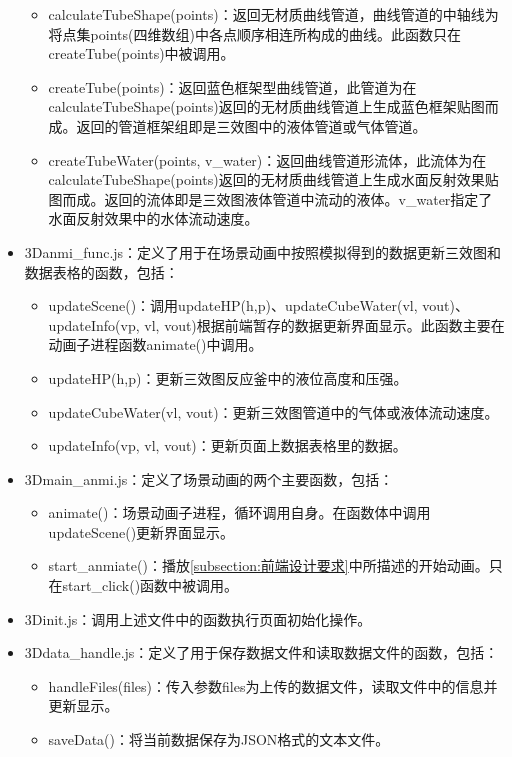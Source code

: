 \documentclass[a4paper]{ctexart}
\begin{document}
\begin{spacing}{1.25}
\begin{itemize}
\begin{itemize}
		\item calculateTubeShape(points)：返回无材质曲线管道，曲线管道的中轴线为将点集points(四维数组)中各点顺序相连所构成的曲线。此函数只在createTube(points)中被调用。
		\item createTube(points)：返回蓝色框架型曲线管道，此管道为在calculateTubeShape(points)返回的无材质曲线管道上生成蓝色框架贴图而成。返回的管道框架组即是三效图中的液体管道或气体管道。
		\item createTubeWater(points, v\_water)：返回曲线管道形流体，此流体为在calculateTubeShape(points)返回的无材质曲线管道上生成水面反射效果贴图而成。返回的流体即是三效图液体管道中流动的液体。v\_water指定了水面反射效果中的水体流动速度。
	\end{itemize}
	\item 3Danmi\_func.js：定义了用于在场景动画中按照模拟得到的数据更新三效图和数据表格的函数，包括：
	\begin{itemize}
		\item updateScene()：调用updateHP(h,p)、updateCubeWater(vl, vout)、updateInfo(vp, vl, vout)根据前端暂存的数据更新界面显示。此函数主要在动画子进程函数animate()中调用。
		\item updateHP(h,p)：更新三效图反应釜中的液位高度和压强。
		\item updateCubeWater(vl, vout)：更新三效图管道中的气体或液体流动速度。
		\item updateInfo(vp, vl, vout)：更新页面上数据表格里的数据。
	\end{itemize}
	\item 3Dmain\_anmi.js：定义了场景动画的两个主要函数，包括：
	\begin{itemize}
		\item animate()：场景动画子进程，循环调用自身。在函数体中调用updateScene()更新界面显示。
		\item start\_anmiate()：播放\ref{subsection:前端设计要求}中所描述的开始动画。只在start\_click()函数中被调用。
	\end{itemize}
	\item 3Dinit.js：调用上述文件中的函数执行页面初始化操作。
	\item 3Ddata\_handle.js：定义了用于保存数据文件和读取数据文件的函数，包括：
	\begin{itemize}
		\item handleFiles(files)：传入参数files为上传的数据文件，读取文件中的信息并更新显示。
		\item saveData()：将当前数据保存为JSON格式的文本文件。
	\end{itemize}
\end{itemize}


\end{spacing}
\end{document}
